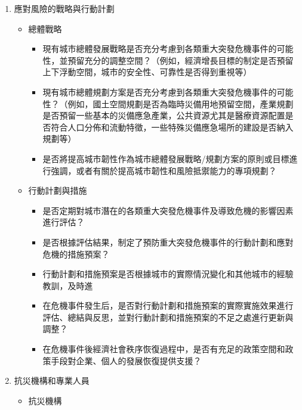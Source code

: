 \documentclass[a4paper,12pt]{article}
\begin{document}
\begin{enumerate}
\begin{enumerate}
\begin{enumerate}
\begin{itemize}
\begin{itemize}
\end{itemize}
\end{itemize}
\item 應對風險的戰略與行動計劃
\label{sec:orgc26083d}
\begin{itemize}
\item 總體戰略
\label{sec:orga06dd72}
\begin{itemize}
\item 現有城市總體發展戰略是否充分考慮到各類重大突發危機事件的可能性，並預留充分的調整空間？（例如，經濟增長目標的制定是否預留上下浮動空間，城市的安全性、可靠性是否得到重視等）\\
\item 現有城市總體規劃方案是否充分考慮到各類重大突發危機事件的可能性？（例如，國土空間規劃是否為臨時災備用地預留空間，產業規劃是否預留一些基本的災備應急產業，公共資源尤其是醫療資源配置是否符合人口分佈和流動特徵，一些特殊災備應急場所的建設是否納入規劃等）\\
\item 是否將提高城市韌性作為城市總體發展戰略/規劃方案的原則或目標進行強調，或者有關於提高城市韌性和風險抵禦能力的專項規劃？\\
\end{itemize}
\item 行動計劃與措施
\label{sec:org880499a}
\begin{itemize}
\item 是否定期對城市潛在的各類重大突發危機事件及導致危機的影響因素進行評估？\\
\item 是否根據評估結果，制定了預防重大突發危機事件的行動計劃和應對危機的措施預案？\\
\item 行動計劃和措施預案是否根據城市的實際情況變化和其他城市的經驗教訓，及時進\\
\item 在危機事件發生后，是否對行動計劃和措施預案的實際實施效果進行評估、總結與反思，並對行動計劃和措施預案的不足之處進行更新與調整？\\
\item 在危機事件後經濟社會秩序恢復過程中，是否有充足的政策空間和政策手段對企業、個人的發展恢復提供支援？\\
\end{itemize}
\end{itemize}
\item 抗災機構和專業人員
\label{sec:orgfbdd19b}
\begin{itemize}
\item 抗災機構
\label{sec:org26503a9}

\end{itemize}
\end{enumerate}
\end{enumerate}
\end{enumerate}
\end{document}
